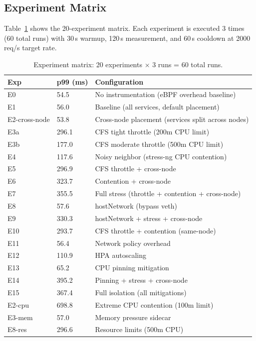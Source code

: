 \documentclass[11pt,a4paper]{article}
\begin{document}
\subsection{Experiment Matrix}

Table~\ref{tab:experiments} shows the 20-experiment matrix. Each experiment is executed 3 times (60 total runs) with 30\,s warmup, 120\,s measurement, and 60\,s cooldown at 2000\,req/s target rate.

\begin{table}[H]
\centering
\caption{Experiment matrix: 20 experiments $\times$ 3 runs = 60 total runs.}
\label{tab:experiments}
\small
\begin{tabularx}{\textwidth}{l l X}
\toprule
\textbf{Exp} & \textbf{p99 (ms)} & \textbf{Configuration} \\
\midrule
E0  & 54.5 & No instrumentation (eBPF overhead baseline) \\
E1  & 56.0 & Baseline (all services, default placement) \\
E2-cross-node & 53.8 & Cross-node placement (services split across nodes) \\
E3a & 296.1 & CFS tight throttle (200m CPU limit) \\
E3b & 177.0 & CFS moderate throttle (500m CPU limit) \\
\midrule
E4  & 117.6 & Noisy neighbor (stress-ng CPU contention) \\
E5  & 296.9 & CFS throttle + cross-node \\
E6  & 323.7 & Contention + cross-node \\
E7  & 355.5 & Full stress (throttle + contention + cross-node) \\
\midrule
E8  & 57.6 & hostNetwork (bypass veth) \\
E9  & 330.3 & hostNetwork + stress + cross-node \\
E10 & 293.7 & CFS throttle + contention (same-node) \\
\midrule
E11 & 56.4 & Network policy overhead \\
E12 & 110.9 & HPA autoscaling \\
E13 & 65.2 & CPU pinning mitigation \\
E14 & 395.2 & Pinning + stress + cross-node \\
E15 & 367.4 & Full isolation (all mitigations) \\
\midrule
E2-cpu & 698.8 & Extreme CPU contention (100m limit) \\
E3-mem & 57.0 & Memory pressure sidecar \\
E8-res & 296.6 & Resource limits (500m CPU) \\
\bottomrule
\end{tabularx}
\end{table}
\end{document}
